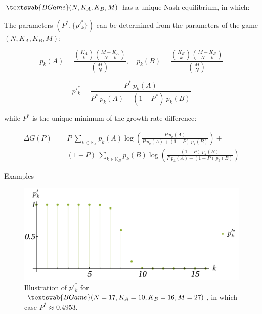 \documentclass{beamer}
\theoremstyle{definition}
\newcommand{\BG}[1]{$\textswab{BGame}(#1)$}
\begin{document}
\begin{frame}[shrink=20]
    \begin{theorem}
\label{thm:Bayesian}
\BG{N,K_A,K_B,M} has a unique Nash equilibrium, in which:

The parameters $(P^*, \{p'^*_k\})$ can be determined from the parameters of the game $(N, K_A, K_B, M)$:

\begin{equation}
    \label{thm:BayesEqHypergeom}
    p_k(A) = \frac{\binom{K_A}{k} \binom{M-K_A}{N-k}}{\binom{M}{N}}, \quad
    p_k(B) = \frac{\binom{K_B}{k} \binom{M-K_B}{N-k}}{\binom{M}{N}}
\end{equation}

\begin{equation}
    p'^*_k = \frac{P^* \ p_k(A)}{P^* \ p_k(A) + (1-P^*) \ p_k(B)}
\end{equation}

while $P^*$ is the unique minimum of the growth rate difference:

\begin{equation}
    \begin{split}
        \Delta G(P)=&P \ \sum_{k \in \mathbb{K}_A} p_k(A) \log \left ( \frac{P \ p_k(A)}{P \ p_k(A)+(1-P) \ p_k(B)} \right ) + \\
                    &(1-P) \ \sum_{k \in \mathbb{K}_B} p_k(B) \log \left ( \frac{(1-P) \ p_k(B)}{P \  p_k(A)+(1-P) \ p_k(B)} \right )
    \end{split}
\end{equation}



\end{theorem}

\end{frame}

\begin{frame}{Examples}

    \begin{figure}[H]
    \centering
    \includegraphics[scale=0.7]{img/ppkAB17_10_16_27.pdf}
    \caption{\small \centering Illustration of $p'^*_k$ for \BG{N=17,K_A=10,K_B=16,M=27}, in which case $P^*\approx 0.4953$.}
    \label{fig:ppkAB}
\end{figure}
    
\end{frame}
\end{document}
